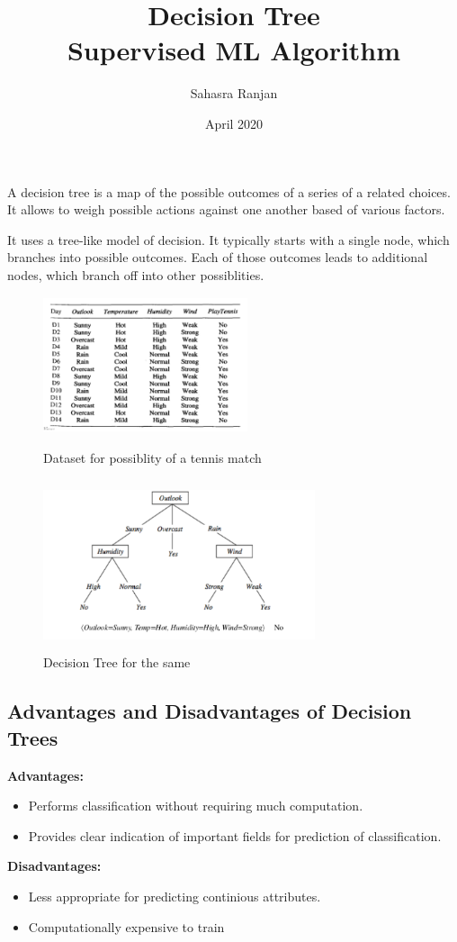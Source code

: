 \documentclass[12pt, A4]{report}
\title{\textbf{Decision Tree}\\ \large{Supervised ML Algorithm}}
\author{Sahasra Ranjan}
\date{April 2020}
\begin{document}
\begin{titlepage}
\maketitle
\end{titlepage}

A decision tree is a map of the possible outcomes of a series of a related choices. It allows to weigh possible actions against one another based of various factors.\par
It uses a tree-like model of decision. It typically starts with a single node, which branches into possible outcomes. Each of those outcomes leads to additional nodes, which branch off into other possiblities. 

\begin{figure}[h]
	\centering
	\includegraphics[width=6cm, height=4cm]{dtdata1.png}
	\caption{Dataset for possiblity of a tennis match}
	\includegraphics[width=8cm, height=5cm]{dtdata2.png}
	\caption{Decision Tree for the same}
\end{figure}

\subsection*{Advantages and Disadvantages of Decision Trees}
	\textbf{Advantages:}
	\begin{itemize}
		\item Performs classification without requiring much computation.
		\item Provides clear indication of important fields for prediction of classification.
	\end{itemize}
	\vspace{15mm}
	\textbf{Disadvantages:}
	\begin{itemize}
		\item Less appropriate for predicting continious attributes.
		\item Computationally expensive to train
	\end{itemize}
\end{document}
